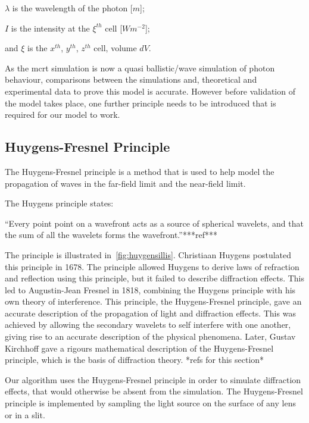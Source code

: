 \indent $\lambda$ is the wavelength of the photon [$m$];

\indent $I$ is the intensity at the $\xi^{th}$ cell [$W m^{-2}$];

\indent and $\xi$ is the $x^{th}$, $y^{th}$, $z^{th}$ cell, volume $dV$.

\medskip

As the \gls{mcrt} simulation is now a quasi ballistic/wave simulation of photon behaviour, comparisons between the simulations and, theoretical and experimental data to prove this model is accurate. However before validation of the model takes place, one further principle needs to be introduced that is required for our model to work.

\subsection{Huygens-Fresnel Principle}

The Huygens-Fresnel principle is a method that is used to help model the propagation of waves in the far-field limit and the near-field limit. 

The Huygens principle states: 

\medskip

``Every point point on a wavefront acts as a source of spherical wavelets, and that the sum of all the wavelets forms the wavefront.''***ref***

\medskip

The principle is illustrated in~\cref{fig:huygensillis}. Christiaan Huygens postulated this principle in 1678.
The principle allowed Huygens to derive laws of refraction and reflection using this principle, but it failed to describe diffraction effects.
This led to Augustin-Jean Fresnel in 1818, combining the Huygens principle with his own theory of interference.
This principle, the Huygens-Fresnel principle, gave an accurate description of the propagation of light and diffraction effects.
This was achieved by allowing the secondary wavelets to self interfere with one another, giving rise to an accurate description of the physical phenomena.
Later, Gustav Kirchhoff gave a rigours mathematical description of the Huygens-Fresnel principle, which is the basis of diffraction theory. *refs for this section*

Our algorithm uses the Huygens-Fresnel principle in order to simulate diffraction effects, that would otherwise be absent from the simulation.
The Huygens-Fresnel principle is implemented by sampling the light source on the surface of any lens or in a slit.




